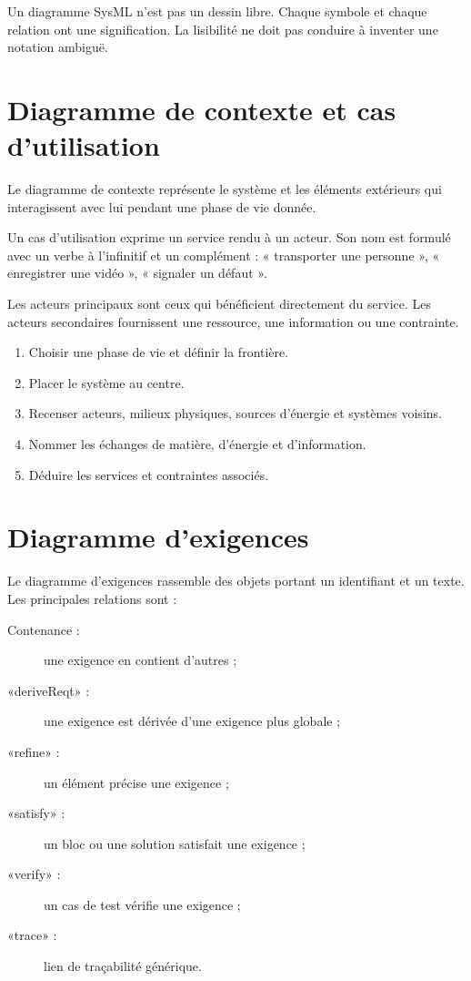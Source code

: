 \begin{ISattention}
Un diagramme SysML n'est pas un dessin libre. Chaque symbole et chaque relation ont une signification. La lisibilité ne doit pas conduire à inventer une notation ambiguë.
\end{ISattention}

\section{Diagramme de contexte et cas d'utilisation}\label{sec:is-contexte-usecase}

Le diagramme de contexte représente le système et les éléments extérieurs qui interagissent avec lui pendant une phase de vie donnée.

\ISContexte

Un cas d'utilisation exprime un service rendu à un acteur. Son nom est formulé avec un verbe à l'infinitif et un complément : « transporter une personne », « enregistrer une vidéo », « signaler un défaut ».

Les acteurs principaux sont ceux qui bénéficient directement du service. Les acteurs secondaires fournissent une ressource, une information ou une contrainte.

\begin{ISmethode}[title={Construire une vue de contexte}]
\begin{enumerate}
  \item Choisir une phase de vie et définir la frontière.
  \item Placer le système au centre.
  \item Recenser acteurs, milieux physiques, sources d'énergie et systèmes voisins.
  \item Nommer les échanges de matière, d'énergie et d'information.
  \item Déduire les services et contraintes associés.
\end{enumerate}
\end{ISmethode}

\section{Diagramme d'exigences}\label{sec:is-rd}

Le diagramme d'exigences rassemble des objets portant un identifiant et un texte. Les principales relations sont :
\begin{description}
  \item[Contenance :] une exigence en contient d'autres ;
  \item[«deriveReqt» :] une exigence est dérivée d'une exigence plus globale ;
  \item[«refine» :] un élément précise une exigence ;
  \item[«satisfy» :] un bloc ou une solution satisfait une exigence ;
  \item[«verify» :] un cas de test vérifie une exigence ;
  \item[«trace» :] lien de traçabilité générique.
\end{description}

